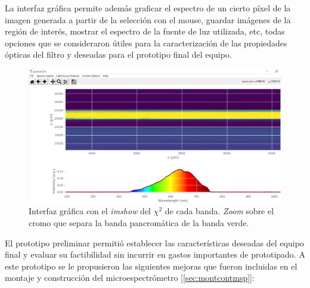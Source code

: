 La interfaz gráfica permite además graficar el espectro de un cierto píxel de la imagen generada a partir de la selección con el mouse, guardar imágenes de la región de interés, mostrar el espectro de la fuente de luz utilizada, etc, todas opciones que se consideraron útiles para la caracterización de las propiedades ópticas del filtro y deseadas para el prototipo final del equipo.

\begin{figure}[H]
	\centering
	\includegraphics[width=1.0\textwidth]{Figs/microespectrometro/chidisp.png}
	\caption{Interfaz gráfica con el \textit{imshow} del $\chi^{2}$ de cada banda. \textit{Zoom} sobre el cromo que separa la banda pancromática de la banda verde.}
	\label{fig:GUI01}
\end{figure}

El prototipo preliminar permitió establecer las características deseadas del equipo final y evaluar su factibilidad sin incurrir en gastos importantes de prototipado. A este prototipo se le propusieron las siguientes mejoras que fueron incluidas en el montaje y construcción del microespectrómetro [\ref{sec:montcontmsp}]:

